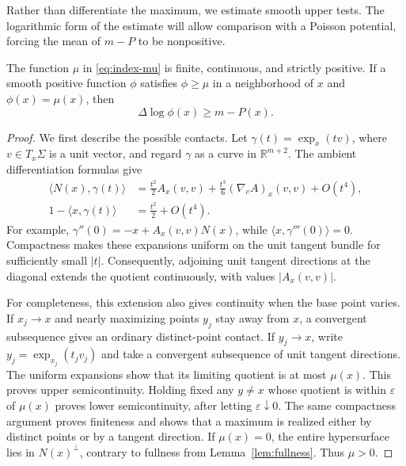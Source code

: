 Rather than differentiate the maximum, we estimate smooth upper tests.
The logarithmic form of the estimate will allow comparison with a Poisson
potential, forcing the mean of $m-P$ to be nonpositive.

\begin{lemma}
\label{lem:index-upper-tests}
The function $\mu$ in \eqref{eq:index-mu} is finite, continuous, and strictly
positive.  If a smooth positive function $\phi$ satisfies $\phi\ge\mu$ in
a neighborhood of $x$ and $\phi(x)=\mu(x)$, then
\begin{equation}\label{eq:index-log-test}
 \Delta\log\phi(x)\ge m-P(x).
\end{equation}
\end{lemma}

\begin{proof}
We first describe the possible contacts.  Let
$\gamma(t)=\exp_x(tv)$, where $v\in T_x\Sigma$ is a unit vector, and regard
$\gamma$ as a curve in $\mathbb R^{m+2}$.  The ambient differentiation
formulas give
\begin{align}
 \langle N(x),\gamma(t)\rangle
   &=\frac{t^2}{2}A_x(v,v)
     +\frac{t^3}{6}(\nabla_vA)_x(v,v)+O(t^4),
       \label{eq:index-contact-numerator}\\
 1-\langle x,\gamma(t)\rangle
   &=\frac{t^2}{2}+O(t^4).
       \label{eq:index-contact-denominator}
\end{align}
For example, $\gamma''(0)=-x+A_x(v,v)N(x)$, while
$\langle x,\gamma'''(0)\rangle=0$.  Compactness makes these expansions
uniform on the unit tangent bundle for sufficiently small $|t|$.
Consequently, adjoining unit tangent directions at the diagonal extends
the quotient continuously, with values $|A_x(v,v)|$.

For completeness, this extension also gives continuity when the base
point varies.  If $x_j\to x$ and nearly maximizing points $y_j$ stay away
from $x$, a convergent subsequence gives an ordinary distinct-point
contact.  If $y_j\to x$, write
$y_j=\exp_{x_j}(t_jv_j)$ and take a convergent subsequence of unit tangent
directions.  The uniform expansions show that its limiting quotient is
at most $\mu(x)$.  This proves upper semicontinuity.  Holding fixed any
$y\ne x$ whose quotient is within $\varepsilon$ of $\mu(x)$ proves lower
semicontinuity, after letting $\varepsilon\downarrow0$.  The same
compactness argument proves finiteness and shows that a maximum is
realized either by distinct points or by a tangent direction.  If
$\mu(x)=0$, the entire hypersurface lies in $N(x)^\perp$, contrary to
fullness from Lemma~\ref{lem:fullness}.  Thus $\mu>0$.


\end{proof}
